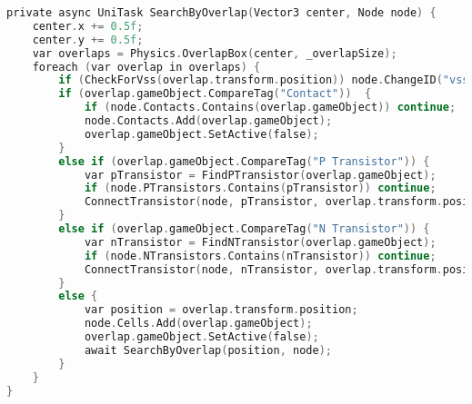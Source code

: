 \begin{lstlisting}[language={C},label=lst:search_overlap,caption={Metoda \texttt{SearchOverlap} wykrywające sąsiadujące obiekty}]
private async UniTask SearchByOverlap(Vector3 center, Node node) {
    center.x += 0.5f;
    center.y += 0.5f;
    var overlaps = Physics.OverlapBox(center, _overlapSize);
    foreach (var overlap in overlaps) {
        if (CheckForVss(overlap.transform.position)) node.ChangeID("vss");
        if (overlap.gameObject.CompareTag("Contact"))  {
            if (node.Contacts.Contains(overlap.gameObject)) continue;
            node.Contacts.Add(overlap.gameObject);
            overlap.gameObject.SetActive(false);
        }
        else if (overlap.gameObject.CompareTag("P Transistor")) {
            var pTransistor = FindPTransistor(overlap.gameObject);
            if (node.PTransistors.Contains(pTransistor)) continue;
            ConnectTransistor(node, pTransistor, overlap.transform.position);
        }
        else if (overlap.gameObject.CompareTag("N Transistor")) {
            var nTransistor = FindNTransistor(overlap.gameObject);
            if (node.NTransistors.Contains(nTransistor)) continue;
            ConnectTransistor(node, nTransistor, overlap.transform.position);
        }
        else {
            var position = overlap.transform.position;
            node.Cells.Add(overlap.gameObject);
            overlap.gameObject.SetActive(false);
            await SearchByOverlap(position, node);
        }
    }
}

\end{lstlisting}
